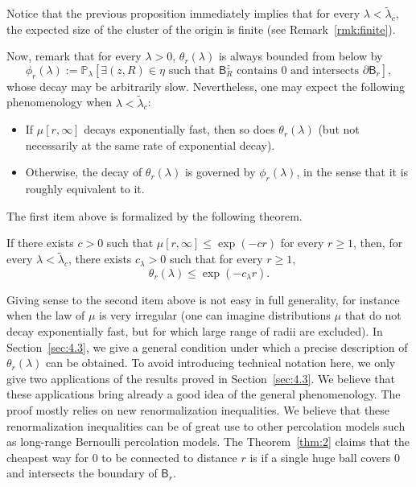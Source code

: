 \documentclass[AHL,Unicode,longabstracts]{cedram}
\begin{document}
Notice that the previous proposition immediately implies that for every $\lambda<\widetilde\lambda_c$, the expected size of the cluster of the origin is finite (see Remark~\ref{rmk:finite}).

Now, remark that for every $\lambda>0$, $\theta_r(\lambda)$ is always bounded from below by
\begin{equation}\label{eq:2}
\phi_r(\lambda):=\mathbb P_\lambda[\exists (z,R)\in\eta\text{ such that } \mathsf B_R^z \text{ contains $0$ and intersects } \partial \mathsf B_r],
\end{equation}
whose decay may be arbitrarily slow. Nevertheless, one may expect the following phenomenology when $\lambda<\widetilde\lambda_c$:
\begin{itemize}%
\item If $\mu[r,\infty]$ decays exponentially fast, then so does $\theta_r(\lambda)$ (but not necessarily at the same rate of exponential decay).
\item Otherwise, the decay of $\theta_r(\lambda)$ is governed by $\phi_r(\lambda)$, in the sense that it is roughly equivalent to it.
\end{itemize}
The first item above is formalized by the following theorem.
\begin{theo}\label{thm:2}
If there exists $c>0$ such that $\mu[r,\infty]\le \exp(-cr)$ for every $r\ge1$, then, for every $\lambda<\widetilde\lambda_c$, there exists $c_\lambda>0$ such that for every $r\ge1$,
\[
\theta_r(\lambda)\le \exp(-c_\lambda r).
\]
\end{theo}

Giving sense to the second item above is not easy in full generality, for instance when the law of $\mu$ is very irregular (one can imagine distributions $\mu$ that do not decay exponentially fast, but for which large range of radii are excluded). In Section~\ref{sec:4.3}, we give a general condition under which a precise description of $\theta_r(\lambda)$ can be obtained. To avoid introducing technical notation here, we only give two applications of the results proved in Section~\ref{sec:4.3}. We believe that these applications bring already a good idea of the general phenomenology. The proof mostly relies on new renormalization inequalities. We believe that these renormalization inequalities can be of great use to other percolation models such as long-range Bernoulli percolation models. The Theorem~\ref{thm:2} claims that the cheapest way for 0 to be connected to distance $r$ is if a single huge ball covers 0 and intersects the boundary of $\mathsf B_r$.
\end{document}
